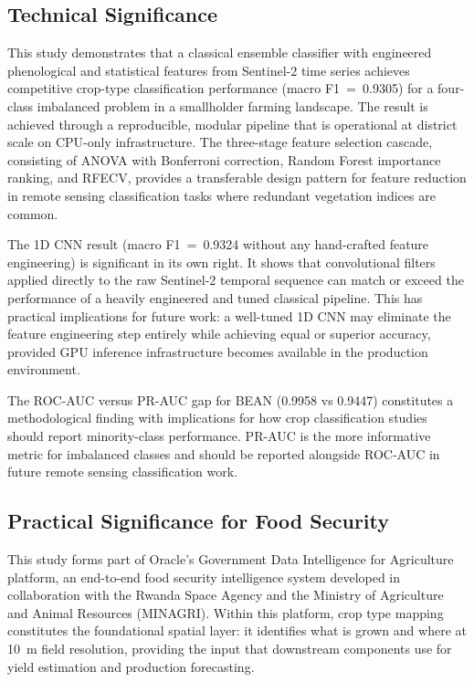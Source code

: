 \subsection{Technical Significance}
\label{subsec:sig_technical}

This study demonstrates that a classical ensemble classifier with
engineered phenological and statistical features from Sentinel-2
time series achieves competitive crop-type classification
performance (macro F1~=~0.9305) for a four-class imbalanced
problem in a smallholder farming landscape. The result is achieved
through a reproducible, modular pipeline that is operational at
district scale on CPU-only infrastructure. The three-stage feature
selection cascade, consisting of ANOVA with Bonferroni correction, Random
Forest importance ranking, and RFECV, provides a transferable
design pattern for feature reduction in remote sensing
classification tasks where redundant vegetation indices are common.

The 1D CNN result (macro F1~=~0.9324 without any hand-crafted
feature engineering) is significant in its own right. It shows
that convolutional filters applied directly to the raw Sentinel-2
temporal sequence can match or exceed the performance of a heavily
engineered and tuned classical pipeline. This has practical
implications for future work: a well-tuned 1D CNN may eliminate
the feature engineering step entirely while achieving equal or
superior accuracy, provided GPU inference infrastructure becomes
available in the production environment.

The ROC-AUC versus PR-AUC gap for BEAN (0.9958 vs 0.9447)
constitutes a methodological finding with implications for how
crop classification studies should report minority-class
performance. PR-AUC is the more informative metric for imbalanced
classes and should be reported alongside ROC-AUC in future remote
sensing classification work.


\subsection{Practical Significance for Food Security}
\label{subsec:sig_practical}

This study forms part of Oracle's Government Data Intelligence
for Agriculture platform, an end-to-end food security intelligence
system developed in collaboration with the Rwanda Space Agency and
the Ministry of Agriculture and Animal Resources (MINAGRI). Within
this platform, crop type mapping constitutes the foundational
spatial layer: it identifies what is grown and where at 10~m
field resolution, providing the input that downstream components
use for yield estimation and production forecasting.

